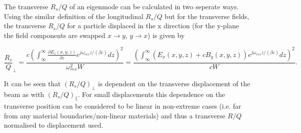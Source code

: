 The transverse $R_{s}/Q$ of an eigenmode can be calculated in two seperate ways. Using the similar definition of the longitudinal $R_{s}/Q$ but for the transverse fields, the transverse $R_{s}/Q$ for a particle displaced in the x direction (for the y-plane the field components are swapped $x \rightarrow y$, $y \rightarrow x$) is given by \cite{AlexejGrudiev}

\begin{equation}
\frac{R_{s}}{Q}_{\perp} = \frac{c \left( \int^{\infty}_{\infty} \frac{\partial E_{z} \left( x,y,z \right)}{\partial z} e^{j \omega_{res}z/\left( \beta c \right)} dz\right)^{2}}{\omega_{res}^{2}W} = \frac{ \left( \int^{\infty}_{\infty}  \left( E_{x} \left( x,y,z \right) + c B_{y} \left( x,y,z \right) \right) e^{j \omega_{res}z/\left( \beta c \right)} dz\right)^{2}}{cW}.
\end{equation}

It can be seen that $(R_{s}/Q)_{\perp}$ is dependent on the transverse displacement of the beam as with $(R_{s}/Q)_{\parallel}$. For small displacements this dependence on the transverse position can be considered to be linear in non-extreme cases (i.e. far from any material boundaries/non-linear materials) and thus a transverse $R/Q$ normalised to displacement used.
